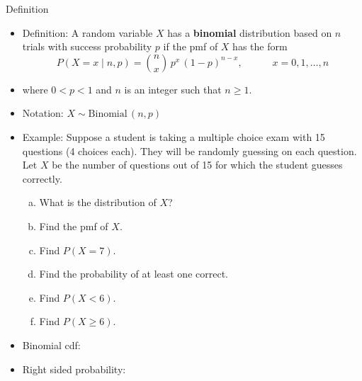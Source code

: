 \documentclass{article}
\newcommand{\follow}[1]{\sim \text{#1}\,}		%
\begin{document}
Definition\bigskip
\begin{itemize}
    \item Definition: A random variable $X$ has a \textbf{binomial} distribution based on $n$ trials with success probability $p$ if the pmf of $X$ has the form
    \[P(X = x \mid n, p) = {n \choose x}\, p^x\, (1 - p)^{n - x}, \quad\quad\quad x = 0, 1, \ldots, n\]\vspace{20pt}
    \item[] where $0 < p < 1$ and $n$ is an integer such that $n \ge 1$.\smallskip
    \item Notation: $X \follow{Binomial}(n, p)$\bigskip
    \item Example: Suppose a student is taking a multiple choice exam with 15 questions (4 choices each). They will be randomly guessing on each question. Let $X$ be the number of questions out of 15 for which the student guesses correctly.
    \begin{enumerate}[a)]
        \item What is the distribution of $X$?\vspace{40pt}
        \item Find the pmf of $X$.\vspace{50pt}
        \item Find $P(X = 7)$.\vspace{50pt}
        \item Find the probability of at least one correct.\vspace{50pt}
        \item Find $P(X < 6)$.\vspace{50pt}
        \item Find $P(X \ge 6)$.\vspace{50pt}
    \end{enumerate}
    \item Binomial cdf:\bigskip
    \item[] Right sided probability:
\end{itemize}\bigskip
\end{document}
